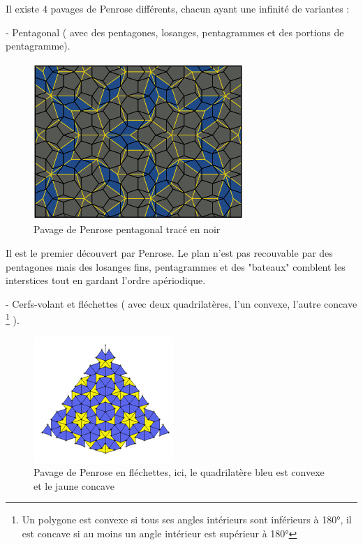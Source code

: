 \documentclass{article}
\begin{document}
Il existe 4 pavages de Penrose différents, chacun ayant une infinité de variantes :

\hspace{1cm}

- Pentagonal ( avec des pentagones, losanges, pentagrammes et des portions de pentagramme).

\begin{figure} [h]
    \center
    \includegraphics [scale=0.4] {image/penrose_pentagone.png}
    \caption{Pavage de Penrose pentagonal tracé en noir}
\end{figure}

Il est le premier découvert par Penrose. Le plan n'est pas recouvable par des pentagones mais des losanges fins, pentagrammes et des "bateaux" comblent les interstices tout en gardant l'ordre apériodique.

\clearpage

- Cerfs-volant et fléchettes ( avec deux quadrilatères, l'un convexe, l'autre concave \footnote{Un polygone est convexe si tous ses angles intérieurs sont inférieurs à 180°, il est concave si au moins un angle intérieur est supérieur à 180°} ).

\begin{figure} [h]
    \center
    \includegraphics [scale=0.5] {image/penrose_flechette.png}
    \caption{Pavage de Penrose en fléchettes, ici, le quadrilatère bleu est convexe et le jaune concave}
\end{figure}
\end{document}
